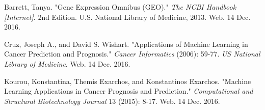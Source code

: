\documentclass[12pt]{scrartcl}
\begin{document}
    \begin{thebibliography}{9}

Barrett, Tanya. "Gene Expression Omnibus (GEO)." \textit{The NCBI Handbook [Internet]}. 2nd Edition. U.S. National Library of Medicine, 2013. Web. 14 Dec. 2016.

Cruz, Joseph A., and David S. Wishart. "Applications of Machine Learning in Cancer Prediction and Prognosis." \textit{Cancer Informatics} (2006): 59-77. \textit{US National Library of Medicine}. Web. 14 Dec. 2016.

Kourou, Konstantina, Themis Exarchos, and Konstantinos Exarchos. "Machine Learning Applications in Cancer Prognosis and Prediction." \textit{Computational and Structural Biotechnology Journal} 13 (2015): 8-17. Web. 14 Dec. 2016.

\end{thebibliography}
    
\end{document}
